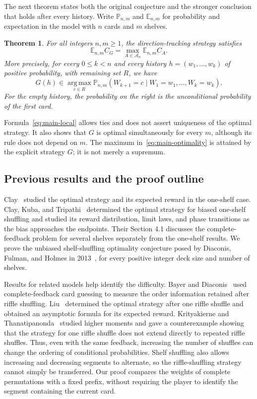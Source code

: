\documentclass[10pt,a4paper]{amsart}
\numberwithin{equation}{section}
\newtheorem{theorem}{Theorem}[section]
\begin{document}
The next theorem states both the original conjecture and the stronger conclusion that holds after every history. Write $\mathbb P_{n,m}$ and $\mathbb E_{n,m}$ for probability and expectation in the model with $n$ cards and $m$ shelves.

\begin{theorem}\label{thm:shelf}
For all integers $n,m\ge1$, the direction-tracking strategy satisfies
\begin{equation}\label{eq:main-optimality}
\mathbb E_{n,m}C_G
=\max_{A\in\mathcal A_n}\mathbb E_{n,m}C_A.
\end{equation}
More precisely, for every $0\le k<n$ and every history $h=(w_1,\ldots,w_k)$ of positive probability, with remaining set $R$, we have
\begin{equation}\label{eq:main-local}
G(h)\in\operatorname*{arg\,max}_{c\in R}
\mathbb P_{n,m}(W_{k+1}=c\mid W_1=w_1,\ldots,W_k=w_k).
\end{equation}
For the empty history, the probability on the right is the unconditional probability of the first card.
\end{theorem}

Formula~\eqref{eq:main-local} allows ties and does not assert uniqueness of the optimal strategy. It also shows that $G$ is optimal simultaneously for every $m$, although its rule does not depend on $m$. The maximum in~\eqref{eq:main-optimality} is attained by the explicit strategy $G$; it is not merely a supremum.
\subsection{Previous results and the proof outline}
Clay~\cite[Theorems 1.4 and 1.5]{Clay} studied the optimal strategy and its expected reward in the one-shelf case. Clay, Kuba, and Tripathi~\cite{CKT} determined the optimal strategy for biased one-shelf shuffling and studied its reward distribution, limit laws, and phase transitions as the bias approaches the endpoints. Their Section 4.1 discusses the complete-feedback problem for several shelves separately from the one-shelf results. We prove the unbiased shelf-shuffling optimality conjecture posed by Diaconis, Fulman, and Holmes in 2013~\cite[Section 5.1]{DFH}, for every positive integer deck size and number of shelves.

Results for related models help identify the difficulty. Bayer and Diaconis~\cite[Section 5.1]{BD} used complete-feedback card guessing to measure the order information retained after riffle shuffling. Liu~\cite{Liu} determined the optimal strategy after one riffle shuffle and obtained an asymptotic formula for its expected reward. Krityakierne and Thanatipanonda~\cite{KT} studied higher moments and gave a counterexample showing that the strategy for one riffle shuffle does not extend directly to repeated riffle shuffles. Thus, even with the same feedback, increasing the number of shuffles can change the ordering of conditional probabilities. Shelf shuffling also allows increasing and decreasing segments to alternate, so the riffle-shuffling strategy cannot simply be transferred. Our proof compares the weights of complete permutations with a fixed prefix, without requiring the player to identify the segment containing the current card.
\end{document}
